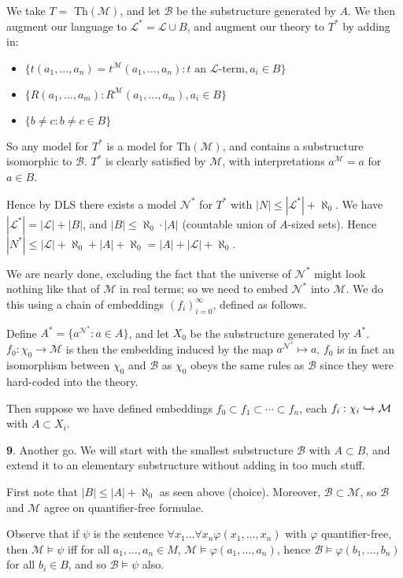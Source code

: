 \documentclass[]{article}
\theoremstyle{custhm}
\theoremstyle{cusdef}
\theoremstyle{custhm}
\theoremstyle{custhm}
\theoremstyle{custhm}
\theoremstyle{custhm}
\theoremstyle{cusdef}
\theoremstyle{remark}
\newcommand{\N}{\mathcal{N}}
\newcommand{\ra}{\rightarrow}
\renewcommand{\L}{\mathcal{L}}
\newcommand{\M}{\mathcal{M}}
\renewcommand{\phi}{\varphi}
\begin{document}
We take $T =$ Th$(\M)$, and let $\mathcal{B}$ be the substructure generated by $A$. We then augment our language to $\L^\ast = \L\cup B$, and augment our theory to $T^\ast$ by adding in:
\begin{itemize}
	\item $\{t(a_1,\dots,a_n)=t^\M(a_1,\dots,a_n): t \textrm{ an }\L\textrm{-term}, a_i\in B\}$
	\item $\{R(a_1,\dots,a_m):R^\M(a_1,\dots,a_m),a_i\in B\}$
	\item $\{b\ne c:b\ne c\in B\}$
\end{itemize}

So any model for $T^\ast$ is a model for Th$(\M)$, and contains a substructure isomorphic to $\mathcal{B}$. $T^\ast$ is clearly satisfied by $\M$, with interpretations $a^\M = a$ for $a\in B$.

Hence by DLS there exists a model $\N^\ast$ for $T^\ast$ with $|N| \le |\L^\ast| + \aleph_0$. We have $|\L^\ast| = |\L| + |B|$, and $|B| \le \aleph_0\cdot |A|$ (countable union of $A$-sized sets). Hence $|N^\ast| \le |\L| + \aleph_0 + |A| + \aleph_0 = |A| + |\L| + \aleph_0$.

We are nearly done, excluding the fact that the universe of $\N^\ast$ might look nothing like that of $\M$ in real terms; so we need to embed $\N^\ast$ into $\M$. We do this using a chain of embeddings $(f_i)_{i=0}^{\infty}$, defined as follows.

Define $A^\ast = \{ a^{\N^\ast} : a\in A \}$, and let $X_0$ be the substructure generated by $A^\ast$. $f_0:\chi_0\ra\M$ is then the embedding induced by the map $a^{\N^\ast}\mapsto a$. $f_0$ is in fact an isomorphism between $\chi_0$ and $\mathcal{B}$ as $\chi_0$ obeys the same rules as $\mathcal{B}$ since they were hard-coded into the theory.

Then suppose we have defined embeddings $f_0\subset f_1\subset\cdots\subset f_n$, each $f_i : \chi_i \xhookrightarrow{} \M$ with $A\subset X_i$.

\textbf{9}. Another go. We will start with the smallest substructure $\mathcal{B}$ with $A\subset B$, and extend it to an elementary substructure without adding in too much stuff.

First note that $|B| \le |A| + \aleph_0$ as seen above (choice). Moreover, $\mathcal{B}\subset \M$, so $\mathcal{B}$ and $\M$ agree on quantifier-free formulae.

Observe that if $\psi$ is the sentence $\forall x_1\dots\forall x_n \phi(x_1,\dots,x_n)$ with $\phi$ quantifier-free, then $\M\models \psi$ iff for all $a_1,\dots,a_n\in M$, $\M\models\phi(a_1,\dots,a_n)$, hence $\mathcal{B}\models \phi(b_1,\dots,b_n)$ for all $b_i\in B$, and so $\mathcal{B}\models \psi$ also. 
\end{document}
